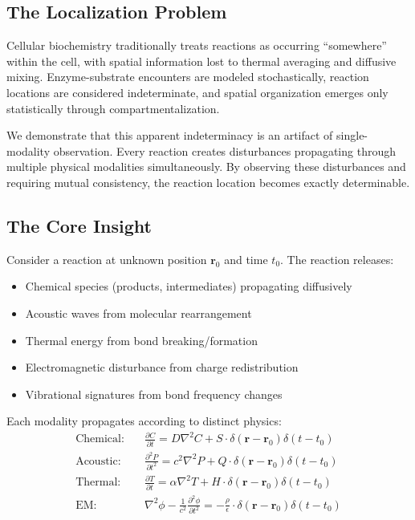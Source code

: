 \documentclass[11pt,a4paper]{article}
\theoremstyle{remark}
\newcommand{\rxnpos}{\mathbf{r}_0}
\newcommand{\rxntime}{t_0}
\begin{document}
\subsection{The Localization Problem}

Cellular biochemistry traditionally treats reactions as occurring ``somewhere'' within the cell, with spatial information lost to thermal averaging and diffusive mixing. Enzyme-substrate encounters are modeled stochastically, reaction locations are considered indeterminate, and spatial organization emerges only statistically through compartmentalization.

We demonstrate that this apparent indeterminacy is an artifact of single-modality observation. Every reaction creates disturbances propagating through multiple physical modalities simultaneously. By observing these disturbances and requiring mutual consistency, the reaction location becomes exactly determinable.

\subsection{The Core Insight}

Consider a reaction at unknown position $\rxnpos$ and time $\rxntime$. The reaction releases:
\begin{itemize}
    \item Chemical species (products, intermediates) propagating diffusively
    \item Acoustic waves from molecular rearrangement
    \item Thermal energy from bond breaking/formation
    \item Electromagnetic disturbance from charge redistribution
    \item Vibrational signatures from bond frequency changes
\end{itemize}

Each modality propagates according to distinct physics:
\begin{align}
    \text{Chemical:} \quad & \frac{\partial C}{\partial t} = D\nabla^2 C + S \cdot \delta(\mathbf{r} - \rxnpos)\delta(t - \rxntime) \\
    \text{Acoustic:} \quad & \frac{\partial^2 P}{\partial t^2} = c^2\nabla^2 P + Q \cdot \delta(\mathbf{r} - \rxnpos)\delta(t - \rxntime) \\
    \text{Thermal:} \quad & \frac{\partial T}{\partial t} = \alpha\nabla^2 T + H \cdot \delta(\mathbf{r} - \rxnpos)\delta(t - \rxntime) \\
    \text{EM:} \quad & \nabla^2\phi - \frac{1}{c^2}\frac{\partial^2\phi}{\partial t^2} = -\frac{\rho}{\epsilon} \cdot \delta(\mathbf{r} - \rxnpos)\delta(t - \rxntime)
\end{align}
\end{document}
